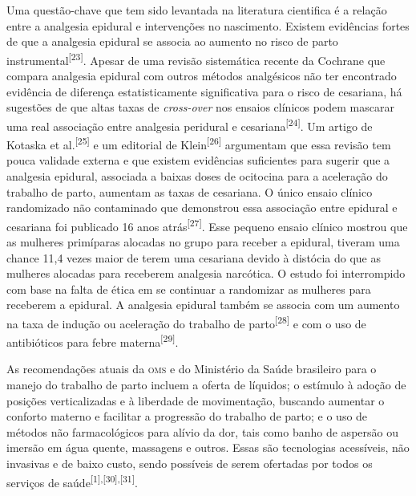 \documentclass{article}
\begin{document}
Uma questão-chave que tem sido levantada na literatura cientifica é a relação
entre a
analgesia epidural e intervenções no nascimento. Existem evidências fortes de
que a
analgesia epidural se associa ao aumento no risco de parto instrumental\textsuperscript{[}\textsuperscript{23}\textsuperscript{]}. Apesar de uma revisão
sistemática recente da Cochrane que compara analgesia epidural com outros
métodos
analgésicos não ter encontrado evidência de diferença estatisticamente
significativa
para o risco de cesariana, há sugestões de que altas taxas de
\textit{cross-over}
nos ensaios clínicos podem mascarar uma real
associação entre analgesia peridural e cesariana\textsuperscript{[}\textsuperscript{24}\textsuperscript{]}. Um artigo de Kotaska et al.\textsuperscript{[}\textsuperscript{25}\textsuperscript{]}
e um editorial de Klein\textsuperscript{[}\textsuperscript{26}\textsuperscript{]}
argumentam que essa revisão tem pouca validade
externa e que existem evidências suficientes para sugerir que a analgesia
epidural,
associada a baixas doses de ocitocina para a aceleração do trabalho de parto,
aumentam as taxas de cesariana. O único ensaio clínico randomizado não
contaminado
que demonstrou essa associação entre epidural e cesariana foi publicado 16 anos
atrás\textsuperscript{[}\textsuperscript{27}\textsuperscript{]}. Esse pequeno ensaio
clínico mostrou que as mulheres primíparas alocadas no grupo para receber a
epidural, tiveram uma chance 11,4 vezes maior de terem uma cesariana devido à
distócia do que as mulheres alocadas para receberem analgesia narcótica. O
estudo
foi interrompido com base na falta de ética em se continuar a randomizar as
mulheres
para receberem a epidural. A analgesia epidural também se associa com um aumento
na
taxa de indução ou aceleração do trabalho de parto\textsuperscript{[}\textsuperscript{28}\textsuperscript{]}
e com o uso de antibióticos para febre materna\textsuperscript{[}\textsuperscript{29}\textsuperscript{]}.

As recomendações atuais da \textsc{oms} e do Ministério da Saúde brasileiro para o manejo
do
trabalho de parto incluem a oferta de líquidos; o estímulo à adoção de posições
verticalizadas e à liberdade de movimentação, buscando aumentar o conforto
materno e
facilitar a progressão do trabalho de parto; e o uso de métodos não
farmacológicos
para alívio da dor, tais como banho de aspersão ou imersão em água quente,
massagens
e outros. Essas são tecnologias acessíveis, não invasivas e de baixo custo,
sendo
possíveis de serem ofertadas por todos os serviços de saúde\textsuperscript{[}\textsuperscript{1}\textsuperscript{]}\textsuperscript{,}\textsuperscript{[}\textsuperscript{30}\textsuperscript{]}\textsuperscript{,}\textsuperscript{[}\textsuperscript{31}\textsuperscript{]}.
\end{document}
